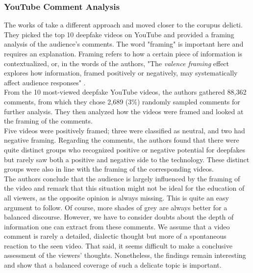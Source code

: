 \documentclass[
  a4paper,  %
  twoside,  %
  bibliography=totoc,
  headsepline,
  cleardoublepage=empty,
  parskip=half,
  draft=false
]{scrbook}
\begin{document}
\subsubsection*{YouTube Comment Analysis}
The works of \citeauthor{leeBelieveNotBelieve2021} take a different approach and moved closer to the corupus delicti. They picked the top 10 deepfake videos on YouTube and provided a framing analysis of the audience's comments. The word "framing" is important here and requires an explanation. Framing refers to how a certain piece of information is contextualized, or, in the words of the authors, "The \textit{valence framing} effect explores how information, framed positively or negatively, may systematically affect audience responses" \cite{leeBelieveNotBelieve2021}. \\
From the 10 most-viewed deepfake YouTube videos, the authors gathered 88,362 comments, from which they chose 2,689 (3\%) randomly sampled comments for further analysis. They then analyzed how the videos were framed and looked at the framing of the comments.\\
Five videos were positively framed; three were classified as neutral, and two had negative framing. Regarding the comments, the authors found that there were quite distinct groups who recognized positive or negative potential for deepfakes but rarely saw both a positive and negative side to the technology. These distinct groups were also in line with the framing of the corresponding videos. \\
The authors conclude that the audience is largely influenced by the framing of the video and remark that this situation might not be ideal for the education of all viewers, as the opposite opinion is always missing. This is quite an easy argument to follow. Of course, more shades of grey are always better for a balanced discourse. However, we have to consider doubts about the depth of information one can extract from these comments. We assume that a video comment is rarely a detailed, dialectic thought but more of a spontaneous reaction to the seen video. That said, it seems difficult to make a conclusive assessment of the viewers' thoughts. Nonetheless, the findings remain interesting and show that a balanced coverage of such a delicate topic is important.
\end{document}
